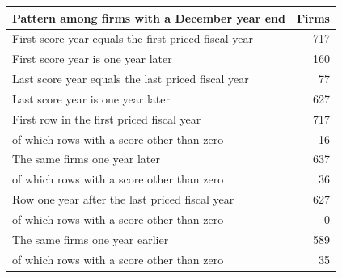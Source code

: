 \begin{tabular}{lr}
\toprule
Pattern among firms with a December year end & Firms \\
\midrule
First score year equals the first priced fiscal year & 717 \\
First score year is one year later & 160 \\
Last score year equals the last priced fiscal year & 77 \\
Last score year is one year later & 627 \\
\midrule
First row in the first priced fiscal year & 717 \\
\quad of which rows with a score other than zero & 16 \\
The same firms one year later & 637 \\
\quad of which rows with a score other than zero & 36 \\
Row one year after the last priced fiscal year & 627 \\
\quad of which rows with a score other than zero & 0 \\
The same firms one year earlier & 589 \\
\quad of which rows with a score other than zero & 35 \\
\bottomrule
\end{tabular}

